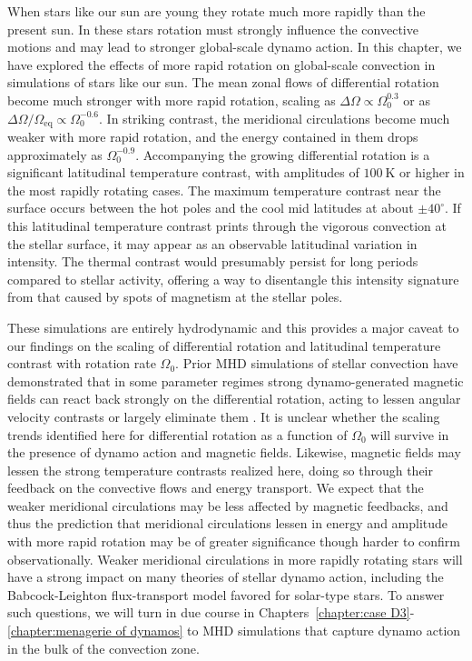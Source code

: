 When stars like our sun are young they rotate much more rapidly than
the present sun.  In these stars rotation must strongly
influence the convective motions and may lead to stronger global-scale
dynamo action. In this chapter, we have explored the effects of more rapid
rotation on global-scale convection in simulations of stars like our
sun.  The mean zonal flows of  differential rotation become much
stronger with more rapid rotation, scaling as $\Delta \Omega \propto \Omega_0^{0.3}$ or as
$\Delta \Omega/\Omega_\mathrm{eq} \propto \Omega_0^{-0.6}$.  In striking
contrast, the meridional circulations become much weaker with more
rapid rotation, and the energy contained in them drops approximately
as $\Omega_0^{-0.9}$.  Accompanying the growing differential rotation
is a significant latitudinal temperature contrast, with amplitudes of
$100~\mathrm{K}$ or higher in the most rapidly rotating cases.  The maximum
temperature contrast near the surface occurs between the hot poles and
the cool mid latitudes at about $\pm 40^\circ$.  If this latitudinal
temperature contrast prints through the vigorous convection at the
stellar surface, it may appear as an observable latitudinal variation
in intensity.  The thermal contrast would presumably persist for long
periods compared to stellar activity, offering a way to disentangle
this intensity signature from that caused by spots of magnetism at the
stellar poles.

\clearpage
These simulations are entirely hydrodynamic and this provides a major
caveat to our findings on the scaling of differential rotation 
and latitudinal temperature contrast with rotation rate $\Omega_0$.
Prior MHD simulations of stellar convection have demonstrated that in
some parameter regimes strong dynamo-generated magnetic fields can
react back strongly on the differential rotation, acting to lessen
angular velocity contrasts or largely eliminate them
\citep[e.g.,][]{Brun_et_al_2005, Featherstone_et_al_2007,Browning_2008}.  
It is unclear whether the scaling trends identified here for
differential rotation as a function of $\Omega_0$ will survive in the
presence of dynamo action and magnetic fields.  Likewise, magnetic
fields may lessen the strong temperature contrasts realized here,
doing so through their feedback on the convective flows and energy transport.
We expect that the weaker meridional circulations may be less affected
by magnetic feedbacks, and thus the prediction that meridional
circulations lessen in energy and amplitude with more rapid rotation
may be of greater significance though harder to confirm
observationally.  Weaker meridional circulations in more rapidly
rotating stars will have a strong impact on many theories of stellar
dynamo action, including the Babcock-Leighton flux-transport model favored for
solar-type stars.   To answer such questions, we will turn in due
course in Chapters~\ref{chapter:case D3}-\ref{chapter:menagerie of dynamos} 
to MHD simulations that capture dynamo action in the bulk of the convection zone.  



